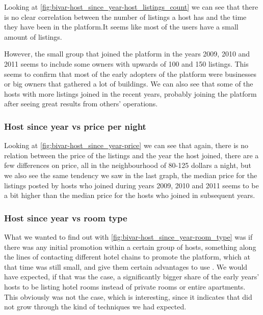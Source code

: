 


Looking at \cref{fig:bivar-host_since_year-host_listings_count} we can see that
there is no clear correlation between the number of listings a host has and the
time they have been in the platform.It seems like most of the users have a small
amount of listings.

However, the small group that joined the platform in the years 2009, 2010 and
2011 seems to include some owners with upwards of 100 and 150 listings. This
seems to confirm that most of the early adopters of the platform were businesses
or big owners that gathered a lot of buildings. We can also see that some of the
hosts with more listings joined in the recent years, probably joining the
platform after seeing great results from others' operations.


\pagebreak
\subsubsection{Host since year vs price per night}


Looking at \cref{fig:bivar-host_since_year-price} we can see that again, there
is no relation between the price of the listings and the year the host joined,
there are a few differences on price, all in the neighbourhood of 80-125 dollars
a night, but we also see the same tendency we saw in the last graph, the median
price for the listings posted by hosts who joined during years 2009, 2010 and
2011 seems to be a bit higher than the median price for the hosts who joined in
subsequent years.

\pagebreak

\subsubsection{Host since year vs room type}



What we wanted to find out with \cref{fig:bivar-host_since_year-room_type} was
if there was any initial promotion within a certain group of hosts, something
along the lines of contacting different hotel chains to promote the platform,
which at that time was still small, and give them certain advantages to use
\airbnb.
We would have expected, if that was the case, a significantly bigger share of
the early years' hosts to be listing hotel rooms instead of private rooms or
entire apartments.
This obviously was not the case, which is interesting, since it indicates that
\airbnb did not grow through the kind of techniques we had expected.


